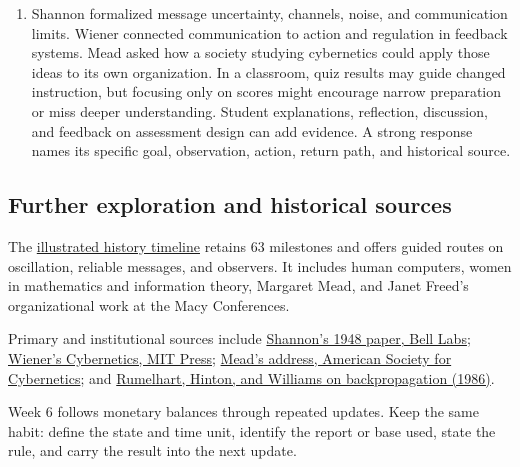 \documentclass[11pt,letterpaper]{article}
\begin{document}
{\begin{enumerate}
\item Shannon formalized message uncertainty, channels, noise, and communication limits. Wiener connected communication to action and regulation in feedback systems. Mead asked how a society studying cybernetics could apply those ideas to its own organization. In a classroom, quiz results may guide changed instruction, but focusing only on scores might encourage narrow preparation or miss deeper understanding. Student explanations, reflection, discussion, and feedback on assessment design can add evidence. A strong response names its specific goal, observation, action, return path, and historical source.
\end{enumerate}
\subsection*{Further exploration and historical sources}
The \href{https://bobovski66.github.io/MathInSociety/information_cybernetics_timeline.html}{illustrated history timeline} retains 63 milestones and offers guided routes on oscillation, reliable messages, and observers. It includes human computers, women in mathematics and information theory, Margaret Mead, and Janet Freed's organizational work at the Macy Conferences.

Primary and institutional sources include \href{https://www.nokia.com/bell-labs/publications-and-media/publications/a-mathematical-theory-of-communication/}{Shannon's 1948 paper, Bell Labs}; \href{https://mitpress.mit.edu/9780262537841/cybernetics-or-control-and-communication-in-the-animal-and-the-machine/}{Wiener's Cybernetics, MIT Press}; \href{https://www.asc-cybernetics.org/CofC/}{Mead's address, American Society for Cybernetics}; and \href{https://doi.org/10.1038/323533a0}{Rumelhart, Hinton, and Williams on backpropagation (1986)}.

Week 6 follows monetary balances through repeated updates. Keep the same habit: define the state and time unit, identify the report or base used, state the rule, and carry the result into the next update.
}
\end{document}
